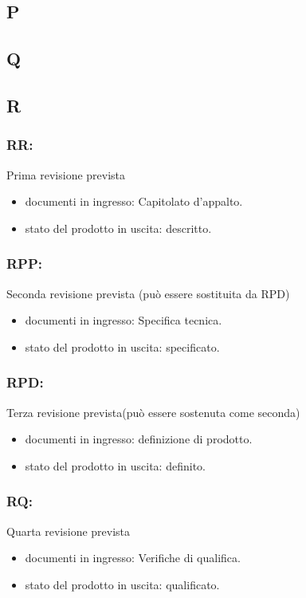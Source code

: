 \subsection*{\huge{P}}
\subsection*{\huge{Q}}
\subsection*{\huge{R}}

\subsubsection*{RR:}  Prima revisione prevista 
\begin{itemize}
\item documenti in ingresso: Capitolato d'appalto.
\item stato del prodotto in uscita: descritto. 
\end{itemize}

\subsubsection*{RPP:} Seconda revisione prevista (pu\`o essere sostituita
da RPD)
\begin{itemize}
\item documenti in ingresso: Specifica tecnica.
\item stato del prodotto in uscita: specificato. 
\end{itemize}

\subsubsection*{RPD:} Terza revisione prevista(pu\`o essere sostenuta come
seconda)
\begin{itemize}
\item documenti in ingresso: definizione di prodotto.
\item stato del prodotto in uscita: definito. 
\end{itemize}

\subsubsection*{RQ:} Quarta revisione prevista
\begin{itemize}
\item documenti in ingresso: Verifiche di qualifica.
\item stato del prodotto in uscita: qualificato. 
\end{itemize}

